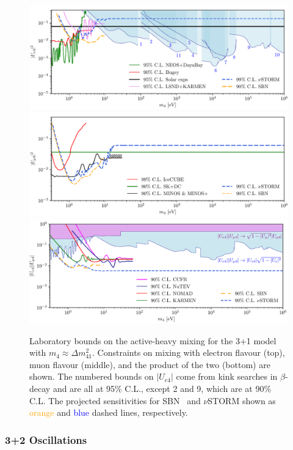\begin{figure}
\includegraphics[width=\textwidth]{figs/Bounds_edis.pdf}
\includegraphics[width=\textwidth]{figs/Bounds_dis.pdf}
\includegraphics[width=\textwidth]{figs/Bounds_app_MH.pdf}
\caption[Laboratory bounds on active-heavy neutrino mixing in a 3+1 model.]{Laboratory bounds on the active-heavy mixing for the 3+1 model with $m_4 \approx \Delta m^2_{41}$. Constraints on mixing with electron flavour (top), muon flavour (middle), and the product of the two (bottom) are shown. The numbered bounds on $|U_{e4}|$ come from kink searches in $\beta$-decay and are all at 95\% C.L., except 2 and 9, which are at 90\% C.L. The projected sensitivities for SBN~\cite{Cianci2017} and $\nu$STORM shown as \textcolor{orange}{orange} and \textcolor{blue}{blue} dashed lines, respectively.\label{fig:all_bounds}}
\end{figure}


\subsubsection{3+2 Oscillations}

